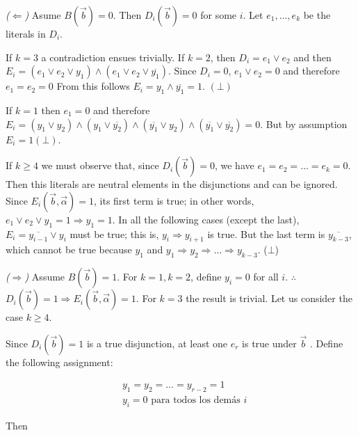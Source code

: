 \textit{($\Leftarrow$)} Asume $B(\overrightarrow{b}) = 0$. Then
$D_i(\overrightarrow{b}) = 0$ for some $i$. Let 
 $e_1, \ldots, e_k$ be the literals in $D_i$.

If $k = 3$ a contradiction ensues trivially. If $k = 2$, then $D_i = e_1 \lor
e_2$ and then $E_i = (e_1 \lor  e_2 \lor y_1) \land  (e_1 \lor  e_2 \lor
\overline{y_1})$. Since $D_i = 0$, $e_1 \lor  e_2 = 0$ and therefore $e_1 = e_2
= 0$ From this follows  $E_i = y_1 \land \overline{y_1} = 1$. $(\bot)$

If $k = 1$ then $e_1 = 0$ and therefore $E_i = (y_1 \lor  y_2) \land  (y_1 \lor
\overline{y_2}) \land  (\overline{y_1} \lor  y_2) \land  (\overline{y_1} \lor
\overline{y_2}) = 0$. But by assumption $E_i = 1 (\bot)$.

If $k\geq 4$ we must observe that, since $D_i(\overrightarrow{b}) =
0$, we have $e_1 = e_2 = \ldots = e_k = 0$. Then this literals 
are neutral elements in the disjunctions and can be ignored.
Since $E_i(\overrightarrow{b}, \overrightarrow{\alpha}) = 1$, its first term 
is true; in other words, $e_1 \lor  e_2 \lor  y_1 = 1
\Rightarrow y_1 = 1$. In all the following cases (except the last),
$E_i = \overline{y_{i-1}} \lor  y_i$ must be true; this is,
$y_i \Rightarrow y_{i+1}$ is true. But the last term is $\overline{y_{k-3}}$,
which cannot be true because $y_1$ and $ y_1 \Rightarrow y_2 \Rightarrow \ldots
\Rightarrow y_{k-3}$. ($\bot$)

\textit{($\Rightarrow$)} Assume $B(\overrightarrow{b}) = 1$. For $k = 1, k = 2$, define 
$y_i = 0$ for all $i$. $\therefore $ $D_i(\overrightarrow{b}) = 1 \Rightarrow
E_i(\overrightarrow{b}, \overrightarrow{\alpha}) = 1$. For $k = 3$ the result 
is trivial. Let us consider the case $k \geq 4$.

Since $D_i(\overrightarrow{b}) = 1$ is a true disjunction, at least one $e_r$
is true under $\overrightarrow{b}$ . Define the following assignment:

\begin{align*}
    &y_1 = y_2 = \ldots = y_{r-2} = 1 \\ 
    &y_i = 0 \text{ para todos los demás $i$}
\end{align*}

Then


